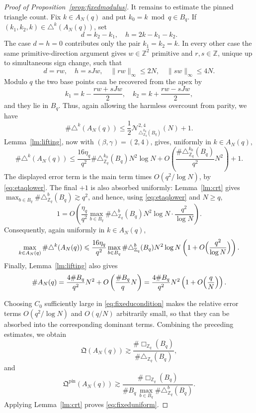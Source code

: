 \documentclass[10pt,a4paper]{amsart}
\numberwithin{equation}{section}
\newcommand{\norm}[1]{\lVert #1\rVert_\infty}
\renewcommand{\le}{\leqslant}
\renewcommand{\ge}{\geqslant}
\begin{document}
\begin{proof}[Proof of Proposition~\ref{prop:fixedmodulus}]
It remains to estimate the pinned triangle count. Fix $k\in A_N(q)$ and put $k_0=k\bmod q\in B_q$. If $(k_1,k_2,k)\in\triangle^k(A_N(q))$, set
\[ d=k_2-k_1, \quad h=2k-k_1-k_2. \]
The case $d=h=0$ contributes only the pair $k_1=k_2=k$. In every other case the same primitive-direction argument gives $w\in\mathbb{Z}^2$ primitive and $r,s\in\mathbb{Z}$, unique up to simultaneous sign change, such that
\[ d=rw, \quad h=sJw, \quad \norm{rw}\le2N, \quad \norm{sw}\le4N. \]
Modulo $q$ the two base points can be recovered from the apex by
\[ k_1=k-\frac{rw+sJw}{2}, \quad k_2=k+\frac{rw-sJw}{2}, \]
and they lie in $B_q$. Thus, again allowing the harmless overcount from parity, we have
\[ \#\triangle^k(A_N(q)) \le \frac12\mathcal{N}_{\triangle^{k_0}_{\mathbb{Z}_q}(B_q)}^{2,4}(N)+1. \]
Lemma~\ref{lm:lifting}, now with $(\beta,\gamma)=(2,4)$, gives, uniformly in $k\in A_N(q)$,
\[ \#\triangle^k(A_N(q)) \le \frac{16\eta_q}{q^2}\#\triangle^{k_0}_{\mathbb{Z}_q}(B_q)N^2\log N + O\left(\frac{\#\triangle^{k_0}_{\mathbb{Z}_q}(B_q)}{q^2}N^2\right)+1. \]
The displayed error term is the main term times $O(q^2/\log N)$, by \eqref{eq:etaqlower}. The final $+1$ is also absorbed uniformly: Lemma~\ref{lm:crt} gives $\max_{b\in B_q}\#\triangle^b_{\mathbb{Z}_q}(B_q)\gtrsim q^2$, and hence, using \eqref{eq:etaqlower} and $N\ge q$,
\[ 1=O\left(\frac{\eta_q}{q^2}\max_{b\in B_q}\#\triangle^b_{\mathbb{Z}_q}(B_q)N^2\log N\cdot\frac{q^2}{\log N}\right). \]
Consequently, again uniformly in $k\in A_N(q)$,
\begin{equation}\label{eq:pinnedasymp}
\max_{k\in A_N(q)}\#\triangle^k(A_N(q)) \le \frac{16\eta_q}{q^2}\max_{b\in B_q}\#\triangle^b_{\mathbb{Z}_q}(B_q)N^2\log N \left(1+O\Bigl(\frac{q^2}{\log N}\Bigr)\right).
\end{equation}
Finally, Lemma~\ref{lm:lifting} also gives
\begin{equation}\label{eq:sizeANupper}
\#A_N(q) = \frac{4\#B_q}{q^2}N^2+O\left(\frac{\#B_q}{q}N\right)
= \frac{4\#B_q}{q^2}N^2\left(1+O\Bigl(\frac{q}{N}\Bigr)\right).
\end{equation}

Choosing $C_0$ sufficiently large in \eqref{eq:fixeducondition} makes the relative error terms $O(q^2/\log N)$ and $O(q/N)$ arbitrarily small, so that they can be absorbed into the corresponding dominant terms.
Combining the preceding estimates, we obtain
\[ \mathfrak{Q}(A_N(q)) \gtrsim \frac{\#\Box_{\mathbb{Z}_q}(B_q)}{\#\triangle_{\mathbb{Z}_q}(B_q)}, \]
and
\[ \mathfrak{Q}^{\mathrm{pin}}(A_N(q)) \gtrsim \frac{\#\Box_{\mathbb{Z}_q}(B_q)}{\#B_q\,\max_{b\in B_q}\#\triangle^b_{\mathbb{Z}_q}(B_q)}. \]
Applying Lemma~\ref{lm:crt} proves \eqref{eq:fixeduniform}.
\end{proof}
\end{document}

